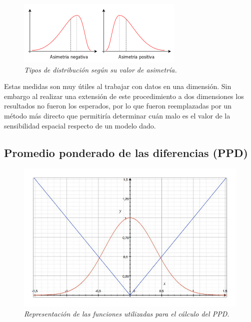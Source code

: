 \begin{figure}[tp]
  \centering
  \includegraphics[scale=.6]{images/asimetria}
  \caption{\em Tipos de distribución según su valor de asimetría.}  
  \label{fig:asimetria}
\end{figure}

Estas medidas son muy útiles al trabajar con datos en una dimensión. Sin embargo al realizar una extensión de este procedimiento a dos dimensiones los resultados no fueron los esperados, por lo que fueron reemplazadas por un método más directo que permitiría determinar cuán malo es el valor de la sensibilidad espacial respecto de un modelo dado.

\subsection{Promedio ponderado de las diferencias (PPD)}

\begin{figure}[tp]
  \centering
  \includegraphics[scale=.4]{images/grafico_ppd}
  \caption{\em Representación de las funciones utilizadas para el cálculo del PPD.}  
  \label{fig:ppd}
\end{figure}

